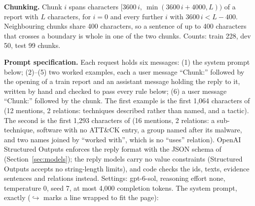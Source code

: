 \documentclass[10pt]{article}
\begin{document}
\textbf{Chunking.} Chunk $i$ spans characters $[3600\,i,\ \min(3600\,i + 4000, L))$ of a report with $L$ characters, for $i = 0$ and every further $i$ with $3600\,i < L - 400$. Neighbouring chunks share 400 characters, so a sentence of up to 400 characters that crosses a boundary is whole in one of the two chunks. Counts: train 228, dev 50, test 99 chunks.

\textbf{Prompt specification.} Each request holds six messages: (1) the system prompt below; (2)--(5) two worked examples, each a user message ``Chunk:'' followed by the opening of a train report and an assistant message holding the reply to it, written by hand and checked to pass every rule below; (6) a user message ``Chunk:'' followed by the chunk. The first example is the first 1,064 characters of \allowbreak{} (12 mentions, 2 relations: techniques described rather than named, and a tactic). The second is the first 1,293 characters of \allowbreak{} (16 mentions, 2 relations: a sub-technique, software with no ATT\&CK entry, a group named after its malware, and two names joined by ``worked with'', which is no ``uses'' relation). OpenAI Structured Outputs enforces the reply format with the JSON schema of  (Section~\ref{sec:models}); the reply models carry no value constraints (Structured Outputs accepts no string-length limits), and code checks the ids, texts, evidence sentences and relations instead. Settings: gpt-6-sol, reasoning effort none, temperature 0, seed 7, at most 4,000 completion tokens. The system prompt, exactly (\textcolor{accent}{$\hookrightarrow$} marks a line wrapped to fit the page):
\end{document}
